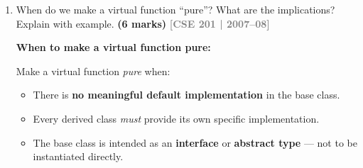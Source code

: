 \documentclass[12pt,a3paper]{article}
\newcommand{\yr}[1]{\hfill\textcolor{gray}{\small\textbf{[#1]}}}
\newcommand{\mk}[1]{\textcolor{orange!70!black}{\small\textbf{(#1 marks)}}}
\begin{document}
\begin{enumerate}
\begin{tcolorbox}
\begin{enumerate}[label=(\alph*)]
  \item \texttt{class A : public B, public C \{ \};}
    \begin{itemize}[itemsep=1pt]
      \item Memory layout: \texttt{B} subobject first, then
        \texttt{C}.
      \item Constructors called: \texttt{B()} first, then
        \texttt{C()}, then \texttt{A()}.
      \item Destructors in reverse: \texttt{A}, \texttt{C}, \texttt{B}.
    \end{itemize}
  \item \texttt{class A : public C, public B \{ \};}
    \begin{itemize}[itemsep=1pt]
      \item Memory layout: \texttt{C} subobject first, then
        \texttt{B}.
      \item Constructors called: \texttt{C()} first, then
        \texttt{B()}, then \texttt{A()}.
    \end{itemize}
\end{enumerate}

Both are otherwise equivalent in terms of member accessibility.
The order matters when \texttt{B} and \texttt{C} have members with
the same name (ambiguity) or when constructor side effects depend on
initialisation order.

\end{tcolorbox}


\item When do we make a virtual function ``pure''? What are the implications? Explain with example. \mk{6}
\yr{CSE 201 | 2007--08}
\begin{tcolorbox}[enhanced,breakable,ansbox,colback=cG!4,colframe=cG,
  boxrule=0.8pt,arc=5pt,
  title={\textbf{Answer --- When to make a virtual function pure; implications}},
  fonttitle=\bfseries\color{white},colbacktitle=cG]

\textbf{When to make a virtual function pure:}

Make a virtual function \emph{pure} when:
\begin{itemize}[itemsep=2pt]
  \item There is \textbf{no meaningful default implementation} in the
    base class.
  \item Every derived class \emph{must} provide its own specific
    implementation.
  \item The base class is intended as an \textbf{interface} or
    \textbf{abstract type} --- not to be instantiated directly.
\end{itemize}


\end{tcolorbox}
\end{enumerate}
\end{document}
